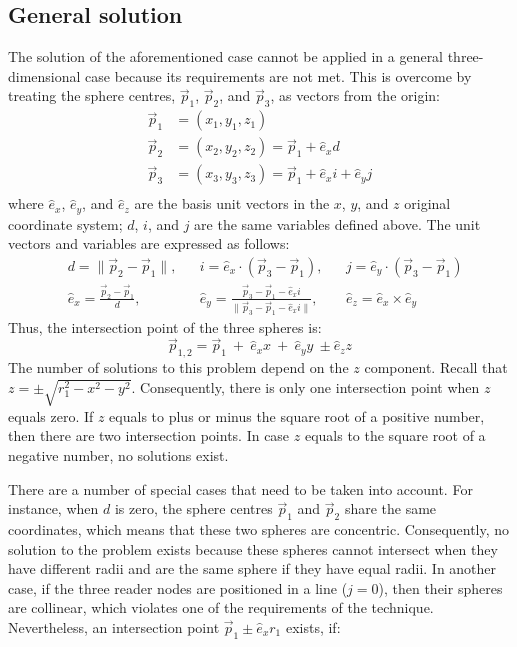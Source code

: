 \subsection{General solution}

The solution of the aforementioned case cannot be applied in a general three-dimensional case because its requirements are not met. This is overcome by treating the sphere centres, $\vec p_1$, $\vec p_2$, and $\vec p_3$, as vectors from the origin:
\begin{align*}
	\vec p_1 &= (x_1, y_1, z_1) \\
	\vec p_2 &= (x_2, y_2, z_2) = \vec p_1 + \hat e_x d \\
	\vec p_3 &= (x_3, y_3, z_3) = \vec p_1 + \hat e_x i + \hat e_y j \\
\end{align*}
where $\hat e_x$, $\hat e_y$, and $\hat e_z$ are the basis unit vectors in the $x$, $y$, and $z$ original coordinate system; $d$, $i$, and $j$ are the same variables defined above. The unit vectors and variables are expressed as follows:
\begin{align*}
	& d = \| \vec p_2 - \vec p_1 \|, &&  i = \hat e_x \cdot ( \vec p_3 - \vec p_1 ), && j = \hat e_y \cdot ( \vec p_3 - \vec p_1 ) \\
	& \hat e_x = \frac{ \vec p_2 - \vec p_1 }{ d }, && \hat e_y = \frac{ \vec p_3 - \vec p_1 - \hat e_x i}{ \| \vec p_3 - \vec p_1 - \hat e_x i \| }, && \hat e_z = \hat e_x \times \hat e_y
\end{align*}
Thus, the intersection point of the three spheres is:
\[\vec p_{1,2} = \vec p_1 \ + \ \hat e_x x \ + \ \hat e_y y \ \pm \hat e_z z\]
The number of solutions to this problem depend on the $z$ component. Recall that $z=\pm \sqrt{r_1^2-x^2-y^2}$. Consequently, there is only one intersection point when $z$ equals zero. If $z$ equals to plus or minus the square root of a positive number, then there are two intersection points. In case $z$ equals to the square root of a negative number, no solutions exist.

There are a number of special cases that need to be taken into account. For instance, when $d$ is zero, the sphere centres $\vec p_1$ and $\vec p_2$ share the same coordinates, which means that these two spheres are concentric. Consequently, no solution to the problem exists because these spheres cannot intersect when they have different radii and are the same sphere if they have equal radii. In another case, if the three reader nodes are positioned in a line  ($j = 0$), then their spheres are collinear, which violates one of the requirements of the technique. Nevertheless, an intersection point $\vec p_1 \pm \hat e_x r_1$ exists, if:

